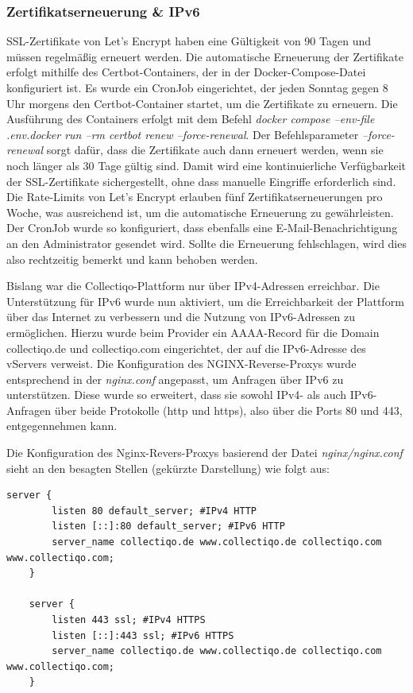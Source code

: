\subsubsection{Zertifikatserneuerung \& IPv6}\label{subsubsec:vserver-zertifikat-ipv6}

SSL-Zertifikate von Let's Encrypt haben eine Gültigkeit von 90 Tagen und müssen regelmäßig erneuert werden.
Die automatische Erneuerung der Zertifikate erfolgt mithilfe des Certbot-Containers, der in der Docker-Compose-Datei konfiguriert ist.
Es wurde ein CronJob eingerichtet, der jeden Sonntag gegen 8 Uhr morgens den Certbot-Container startet, um die Zertifikate zu erneuern.
Die Ausführung des Containers erfolgt mit dem Befehl \textit{docker compose --env-file .env.docker run --rm certbot renew --force-renewal}.
Der Befehlsparameter \textit{--force-renewal} sorgt dafür, dass die Zertifikate auch dann erneuert werden, wenn sie noch länger als 30 Tage gültig sind.
Damit wird eine kontinuierliche Verfügbarkeit der SSL-Zertifikate sichergestellt, ohne dass manuelle Eingriffe erforderlich sind.
Die Rate-Limits von Let's Encrypt erlauben fünf Zertifikatserneuerungen pro Woche, was ausreichend ist, um die automatische Erneuerung zu gewährleisten.
Der CronJob wurde so konfiguriert, dass ebenfalls eine E-Mail-Benachrichtigung an den Administrator gesendet wird.
Sollte die Erneuerung fehlschlagen, wird dies also rechtzeitig bemerkt und kann behoben werden.
\newline

Bislang war die Collectiqo-Plattform nur über IPv4-Adressen erreichbar.
Die Unterstützung für IPv6 wurde nun aktiviert, um die Erreichbarkeit der Plattform über das Internet zu verbessern und die Nutzung von IPv6-Adressen zu ermöglichen.
Hierzu wurde beim Provider ein AAAA-Record für die Domain collectiqo.de und collectiqo.com eingerichtet, der auf die IPv6-Adresse des vServers verweist.
Die Konfiguration des NGINX-Reverse-Proxys wurde entsprechend in der \textit{nginx.conf} angepasst, um Anfragen über IPv6 zu unterstützen.
Diese wurde so erweitert, dass sie sowohl IPv4- als auch IPv6-Anfragen über beide Protokolle (http und https), also über die Ports 80 und 443, entgegennehmen kann.

Die Konfiguration des Nginx-Revers-Proxys basierend der Datei \textit{nginx/nginx.conf} sieht an den besagten Stellen (gekürzte Darstellung) wie folgt aus:
\vspace{1em}
\begin{lstlisting}[label={lst:lst-nginx-config}, caption=NGINX-Konfiguration für IPv4 und IPv6]
    server {
        listen 80 default_server; #IPv4 HTTP
        listen [::]:80 default_server; #IPv6 HTTP
        server_name collectiqo.de www.collectiqo.de collectiqo.com www.collectiqo.com;
    }

    server {
        listen 443 ssl; #IPv4 HTTPS
        listen [::]:443 ssl; #IPv6 HTTPS
        server_name collectiqo.de www.collectiqo.de collectiqo.com www.collectiqo.com;
    }
\end{lstlisting}
\vspace{1em}

